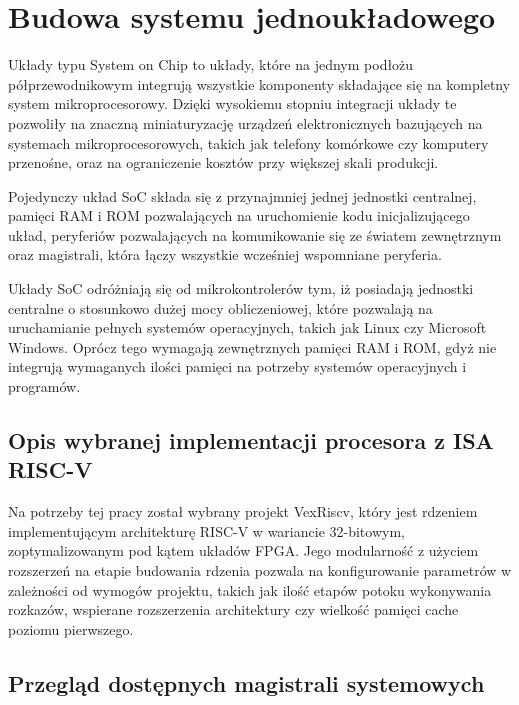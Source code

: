 \section{Budowa systemu jednoukładowego}
Układy typu System on Chip to układy, które na jednym podłożu półprzewodnikowym integrują wszystkie komponenty składające się na kompletny system mikroprocesorowy. Dzięki wysokiemu stopniu integracji układy te pozwoliły na znaczną miniaturyzację urządzeń elektronicznych bazujących na systemach mikroprocesorowych, takich jak telefony komórkowe czy komputery przenośne, oraz na ograniczenie kosztów przy większej skali produkcji.

Pojedynczy układ SoC składa się z przynajmniej jednej jednostki centralnej, pamięci RAM i ROM pozwalających na uruchomienie kodu inicjalizującego układ, peryferiów pozwalających na komunikowanie się ze światem zewnętrznym oraz magistrali, która łączy wszystkie wcześniej wspomniane peryferia.

Układy SoC odróżniają się od mikrokontrolerów tym, iż posiadają jednostki centralne o stosunkowo dużej mocy obliczeniowej, które pozwalają na uruchamianie pełnych systemów operacyjnych, takich jak Linux czy Microsoft Windows. Oprócz tego wymagają zewnętrznych pamięci RAM i ROM, gdyż nie integrują wymaganych ilości pamięci na potrzeby systemów operacyjnych i programów.


\subsection{Opis wybranej implementacji procesora z ISA RISC-V}
Na potrzeby tej pracy został wybrany projekt VexRiscv\cite{vexriscv:2018:Online}, który jest rdzeniem implementującym architekturę RISC-V w wariancie 32-bitowym, zoptymalizowanym pod kątem układów FPGA. Jego modularność z użyciem rozszerzeń na etapie budowania rdzenia pozwala na konfigurowanie parametrów w zależności od wymogów projektu, takich jak ilość etapów potoku wykonywania rozkazów, wspierane rozszerzenia architektury czy wielkość pamięci cache poziomu pierwszego.


\subsection{Przegląd dostępnych magistrali systemowych}

